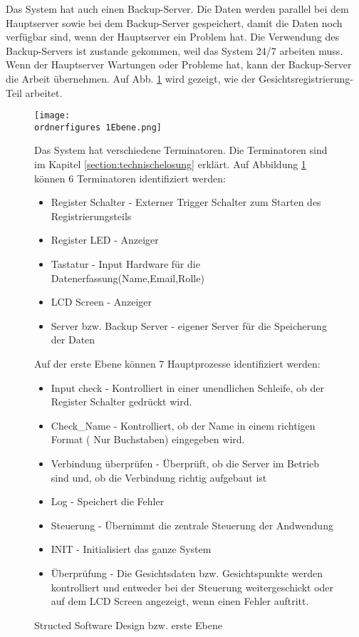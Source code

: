 Das System hat auch einen Backup-Server. Die Daten werden parallel bei dem Hauptserver sowie bei dem Backup-Server gespeichert, damit die Daten noch verf\"ugbar sind, wenn der Hauptserver ein Problem hat. Die Verwendung des Backup-Servers ist zustande gekommen, weil das System 24/7 arbeiten muss. Wenn der Hauptserver Wartungen oder Probleme hat, kann der Backup-Server die Arbeit \"ubernehmen. Auf Abb. \ref{fig:1Ebene_Gesichtsregistrierung} wird gezeigt, wie der Gesichtsregistrierung-Teil arbeitet.

\begin{figure}[H]
	\texttt{[image: \\ordnerfigures 1Ebene.png]}
	\caption{Structed Software Design bzw. erste Ebene } 
	
	Das System hat verschiedene Terminatoren. Die Terminatoren sind im Kapitel  \ref{section:technischelosung} erkl\"art. 
	Auf Abbildung \ref{fig:1Ebene_Gesichtsregistrierung} k\"onnen 6 Terminatoren identifiziert werden:
	\begin{itemize}
	\item Register Schalter - Externer Trigger Schalter zum Starten des Registrierungsteils 
	\item Register LED - Anzeiger 
	\item Tastatur - Input Hardware f\"ur die Datenerfassung(Name,Email,Rolle) 
	\item LCD Screen - Anzeiger 
	\item Server bzw. Backup Server - eigener Server f\"ur die Speicherung der Daten 
	\end{itemize}
	Auf der erste Ebene k\"onnen 7 Hauptprozesse identifiziert werden:
	\begin{itemize}
	\item Input check - Kontrolliert in einer unendlichen Schleife, ob der Register Schalter gedr\"uckt wird.
	\item Check\_Name - Kontrolliert, ob der Name in einem richtigen Format ( Nur Buchstaben) eingegeben wird. 
	\item Verbindung \"uberpr\"ufen - \"Uberpr\"uft, ob die Server im Betrieb sind und, ob die Verbindung richtig aufgebaut ist
	\item Log - Speichert die Fehler
	\item Steuerung - \"Ubernimmt die zentrale Steuerung der Andwendung
	\item INIT - Initialisiert das ganze System
	\item \"Uberpr\"ufung - Die Gesichtsdaten bzw. Gesichtspunkte werden kontrolliert und entweder bei der Steuerung weitergeschickt oder auf dem LCD Screen angezeigt, wenn einen Fehler auftritt.
	\end{itemize}
	\label{fig:1Ebene_Gesichtsregistrierung}
\end{figure}
